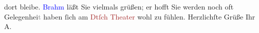                     dort bleibe.\pend
           \pstart
           \textcolor{blue}{Brahm}{}\ledrightnote{\textcolor{blue}{Otto Brahm}} läßt Sie vielmals grüßen; er hofft Sie
                    werden noch oft Gelegenhei\textcolor{gray}{t} haben ſich am \textcolor{brown}{Dtſch
                        Theater}{}\ledrightnote{\textcolor{brown}{Deutsches Theater Berlin}} wohl zu fühlen.\pend
           \pstart Herzlichſte Grüße Ihr \spacefill\mbox{A.}\pend{}\endnumbering{}  
      